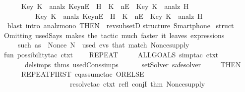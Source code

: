 \begin{isabellebody}
  \ \ \ \ \ {\isachardoublequoteopen}{\isacharparenleft}Key\ K\ {\isasymin}\ analz\ {\isacharparenleft}Key{\isacharbackquote}nE\ {\isasymunion}\ H{\isacharparenright}{\isacharparenright}\ {\isasymlongrightarrow}\ {\isacharparenleft}K\ {\isasymin}\ nE\ {\isacharbar}\ Key\ K\ {\isasymin}\ analz\ H{\isacharparenright}\ \ {\isasymLongrightarrow}\ \ \isanewline
  \ \ \ \ \ \ \ \ \ {\isacharparenleft}Key\ K\ {\isasymin}\ analz\ {\isacharparenleft}Key{\isacharbackquote}nE\ {\isasymunion}\ H{\isacharparenright}{\isacharparenright}\ {\isacharequal}\ {\isacharparenleft}K\ {\isasymin}\ nE\ {\isacharbar}\ Key\ K\ {\isasymin}\ analz\ H{\isacharparenright}{\isachardoublequoteclose}\isanewline
  \isadelimproof
  \endisadelimproof
  \isatagproof
  \isamarkupfalse%
  \ {\isacharparenleft}blast\ intro{\isacharcolon}\ analz{\isacharunderscore}mono\ {\isacharbrackleft}THEN\ {\isacharbrackleft}{}{\isacharbrackright}\ rev{\isacharunderscore}subsetD{\isacharbrackright}{\isacharparenright}%
  \endisatagproof
  {\isafoldproof}%
  \isadelimproof
  \endisadelimproof
  \isadelimdocument
  \endisadelimdocument
  \isatagdocument
  \isamarkuptrue%
  \endisatagdocument
  {\isafolddocument}%
  \isadelimdocument
  \endisadelimdocument
  \isadelimML
  \endisadelimML
  \isatagML
  \isamarkupfalse%
  \isanewline
  {\isacartoucheopen}\isanewline
  structure\ Smartphone\ {\isacharequal}\isanewline
  struct\isanewline
  \isanewline
  {\isacharparenleft}{\isacharasterisk}Omitting\ used{\isacharunderscore}Says\ makes\ the\ tactic\ much\ faster{\isacharcolon}\ it\ leaves\ expressions\isanewline
  \ \ \ \ such\ as\ \ Nonce\ {\isacharquery}N\ {\isasymnotin}\ used\ evs\ that\ match\ Nonce{\isacharunderscore}supply{\isacharasterisk}{\isacharparenright}\isanewline
  fun\ possibility{\isacharunderscore}tac\ ctxt\ {\isacharequal}\isanewline
  \ \ \ {\isacharparenleft}REPEAT\ \isanewline
  \ \ \ \ {\isacharparenleft}ALLGOALS\ {\isacharparenleft}simp{\isacharunderscore}tac\ {\isacharparenleft}ctxt\isanewline
  \ \ \ \ \ \ delsimps\ {\isacharat}{\isacharbraceleft}thms\ used{\isacharunderscore}Cons{\isacharunderscore}simps{\isacharbraceright}\isanewline
  \ \ \ \ \ \ setSolver\ safe{\isacharunderscore}solver{\isacharparenright}{\isacharparenright}\isanewline
  \ \ \ \ \ THEN\isanewline
  \ \ \ \ \ REPEAT{\isacharunderscore}FIRST\ {\isacharparenleft}eq{\isacharunderscore}assume{\isacharunderscore}tac\ ORELSE{\isacharprime}\ \isanewline
  \ \ \ \ \ \ \ \ \ \ \ \ \ \ \ \ \ \ \ resolve{\isacharunderscore}tac\ ctxt\ {\isacharbrackleft}refl{\isacharcomma}\ conjI{\isacharcomma}\ {\isacharat}{\isacharbraceleft}thm\ Nonce{\isacharunderscore}supply{\isacharbraceright}{\isacharbrackright}{\isacharparenright}{\isacharparenright}{\isacharparenright}\isanewline

\end{isabellebody}
